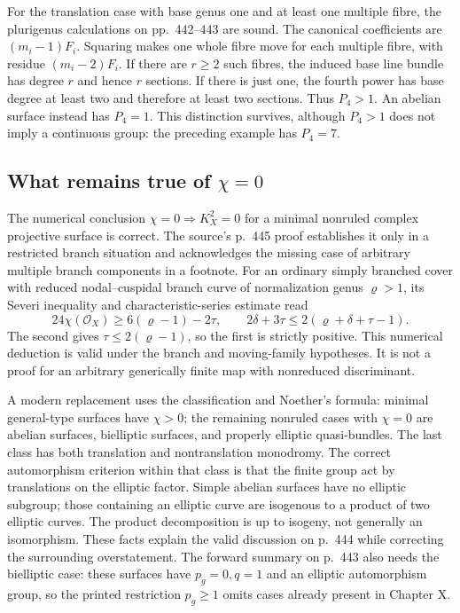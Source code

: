 For the translation case with base genus one and at least one multiple fibre, the plurigenus calculations on pp.~442--443 are sound. The canonical coefficients are \((m_i-1)F_i\). Squaring makes one whole fibre move for each multiple fibre, with residue \((m_i-2)F_i\). If there are \(r\ge2\) such fibres, the induced base line bundle has degree \(r\) and hence \(r\) sections. If there is just one, the fourth power has base degree at least two and therefore at least two sections. Thus \(P_4>1\). An abelian surface instead has \(P_4=1\). This distinction survives, although \(P_4>1\) does not imply a continuous group: the preceding example has \(P_4=7\).

\subsection{What remains true of \texorpdfstring{$\chi=0$}{χ=0}}

The numerical conclusion \(\chi=0\Rightarrow K_X^2=0\) for a minimal nonruled complex projective surface is correct. The source's p.~445 proof establishes it only in a restricted branch situation and acknowledges the missing case of arbitrary multiple branch components in a footnote. For an ordinary simply branched cover with reduced nodal--cuspidal branch curve of normalization genus \(\varrho>1\), its Severi inequality and characteristic-series estimate read
\[
24\chi(\mathcal O_X)\ge6(\varrho-1)-2\tau,
\qquad
2\delta+3\tau\le2(\varrho+\delta+\tau-1).
\]
The second gives \(\tau\le2(\varrho-1)\), so the first is strictly positive. This numerical deduction is valid under the branch and moving-family hypotheses. It is not a proof for an arbitrary generically finite map with nonreduced discriminant.

A modern replacement uses the classification and Noether's formula: minimal general-type surfaces have \(\chi>0\); the remaining nonruled cases with \(\chi=0\) are abelian surfaces, bielliptic surfaces, and properly elliptic quasi-bundles. The last class has both translation and nontranslation monodromy. The correct automorphism criterion within that class is that the finite group act by translations on the elliptic factor. Simple abelian surfaces have no elliptic subgroup; those containing an elliptic curve are isogenous to a product of two elliptic curves. The product decomposition is up to isogeny, not generally an isomorphism. These facts explain the valid discussion on p.~444 while correcting the surrounding overstatement. The forward summary on p.~443 also needs the bielliptic case: these surfaces have \(p_g=0,q=1\) and an elliptic automorphism group, so the printed restriction \(p_g\ge1\) omits cases already present in Chapter X.

